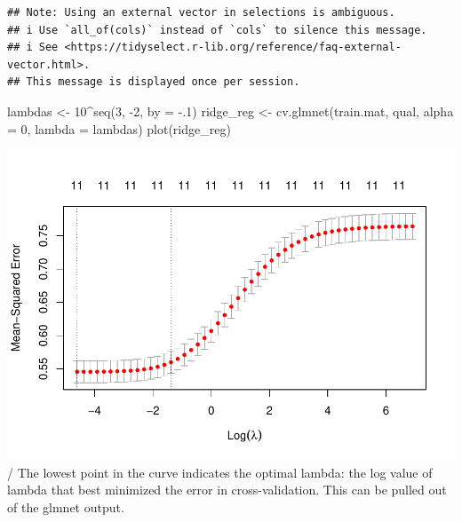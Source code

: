 \documentclass[
]{book}
\newenvironment{Shaded}{\begin{snugshade}}{\end{snugshade}}
\newcommand{\AttributeTok}[1]{\textcolor[rgb]{0.77,0.63,0.00}{#1}}
\newcommand{\DecValTok}[1]{\textcolor[rgb]{0.00,0.00,0.81}{#1}}
\newcommand{\FunctionTok}[1]{\textcolor[rgb]{0.00,0.00,0.00}{#1}}
\newcommand{\NormalTok}[1]{#1}
\newcommand{\OtherTok}[1]{\textcolor[rgb]{0.56,0.35,0.01}{#1}}
\newcommand{\SpecialCharTok}[1]{\textcolor[rgb]{0.00,0.00,0.00}{#1}}
\begin{document}
\begin{Shaded}
\end{Shaded}

\begin{verbatim}
## Note: Using an external vector in selections is ambiguous.
## i Use `all_of(cols)` instead of `cols` to silence this message.
## i See <https://tidyselect.r-lib.org/reference/faq-external-vector.html>.
## This message is displayed once per session.
\end{verbatim}

\begin{Shaded}
\begin{Highlighting}[]
\NormalTok{lambdas }\OtherTok{\textless{}{-}} \DecValTok{10}\SpecialCharTok{\^{}}\FunctionTok{seq}\NormalTok{(}\DecValTok{3}\NormalTok{, }\SpecialCharTok{{-}}\DecValTok{2}\NormalTok{, }\AttributeTok{by =} \SpecialCharTok{{-}}\NormalTok{.}\DecValTok{1}\NormalTok{)}
\NormalTok{ridge\_reg }\OtherTok{\textless{}{-}} \FunctionTok{cv.glmnet}\NormalTok{(train.mat, qual, }\AttributeTok{alpha =} \DecValTok{0}\NormalTok{, }\AttributeTok{lambda =}\NormalTok{ lambdas)}
\FunctionTok{plot}\NormalTok{(ridge\_reg)}
\end{Highlighting}
\end{Shaded}

\includegraphics{FinalProject-Bright-Santoro_files/figure-latex/unnamed-chunk-41-1.pdf}
/ The lowest point in the curve indicates the optimal lambda: the log value of lambda that best minimized the error in cross-validation. This can be pulled out of the glmnet output.
\end{document}
